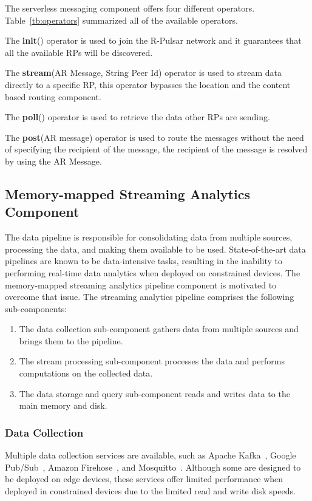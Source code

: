 The serverless messaging component offers four different operators. Table~\ref{tb:operators} summarized all of the available operators.

The \textbf{init}() operator is used to join the R-Pulsar network and it guarantees that all the available RPs will be discovered.

The \textbf{stream}(AR Message, String Peer Id) operator is used to stream data directly to a specific RP, this operator bypasses the location and the content based routing component.

The \textbf{poll}() operator is used to retrieve the data other RPs are sending.

The \textbf{post}(AR message) operator is used to route the messages without the need of specifying the recipient of the message, the recipient of the message is resolved by using the AR Message.

\subsection{Memory-mapped Streaming Analytics Component}
The data pipeline is responsible for consolidating data from multiple sources, processing the data, and making them available to be used. State-of-the-art data pipelines are known to be data-intensive tasks, resulting in the inability to performing real-time data analytics when deployed on constrained devices. The memory-mapped streaming analytics pipeline component is motivated to overcome that issue. The streaming analytics pipeline comprises the following sub-components: 

\begin{enumerate}

\item The data collection sub-component gathers data from multiple sources and brings them to the pipeline.
\item The stream processing sub-component processes the data and performs computations on the collected data.   
\item The data storage and query sub-component reads and writes data to the main memory and disk.

\end{enumerate}

\subsubsection{Data Collection}

Multiple data collection services are available, such as Apache Kafka~\cite{kafka}, Google Pub/Sub~\cite{google}, Amazon Firehose~\cite{amazon}, and Mosquitto~\cite{mosquitto}. Although some are designed to be deployed on edge devices, these services offer limited performance when deployed in constrained devices due to the limited read and write disk speeds.

